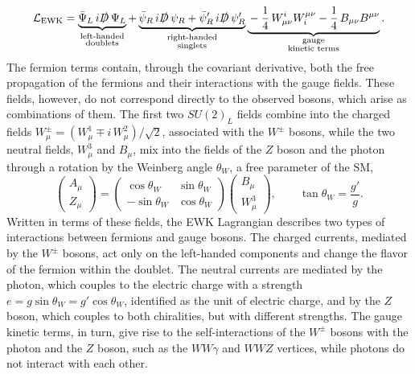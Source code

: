 \begin{equation}
    \mathcal{L}_{\text{EWK}} =
    \underbrace{\bar{\Psi}_L\, i \slashed{D}\, \Psi_L}_{\substack{\text{left-handed}\\ \text{doublets}}}
    + \underbrace{\bar{\psi}_R\, i \slashed{D}\, \psi_R + \bar{\psi}'_R\, i \slashed{D}\, \psi'_R}_{\substack{\text{right-handed}\\ \text{singlets}}}
    \underbrace{{}- \frac{1}{4}\, W^i_{\mu\nu} W_i^{\mu\nu} - \frac{1}{4}\, B_{\mu\nu} B^{\mu\nu}}_{\substack{\text{gauge}\\ \text{kinetic terms}}}.
    \label{EW_Lagrangian}
\end{equation}
%
The fermion terms contain, through the covariant derivative, both the free propagation of the fermions and their interactions with the gauge fields. These fields, however, do not correspond directly to the observed bosons, which arise as combinations of them. The first two $SU(2)_L$ fields combine into the charged fields $W^\pm_\mu = (W^1_\mu \mp i\,W^2_\mu)/\sqrt{2}$, associated with the $W^\pm$ bosons, while the two neutral fields, $W^3_\mu$ and $B_\mu$, mix into the fields of the $Z$ boson and the photon through a rotation by the Weinberg angle $\theta_W$, a free parameter of the SM,
\begin{equation}
    \begin{pmatrix} A_\mu \\ Z_\mu \end{pmatrix} = \begin{pmatrix} \cos\theta_W & \sin\theta_W \\ -\sin\theta_W & \cos\theta_W \end{pmatrix} \begin{pmatrix} B_\mu \\ W^3_\mu \end{pmatrix}, \qquad \tan\theta_W = \frac{g'}{g}.
    \label{eq:weinberg_mixing}
\end{equation}
%
Written in terms of these fields, the EWK Lagrangian describes two types of interactions between fermions and gauge bosons. The charged currents, mediated by the $W^\pm$ bosons, act only on the left-handed components and change the flavor of the fermion within the doublet. The neutral currents are mediated by the photon, which couples to the electric charge with a strength $e = g\sin\theta_W = g'\cos\theta_W$, identified as the unit of electric charge, and by the $Z$ boson, which couples to both chiralities, but with different strengths. The gauge kinetic terms, in turn, give rise to the self-interactions of the $W^\pm$ bosons with the photon and the $Z$ boson, such as the $WW\gamma$ and $WWZ$ vertices, while photons do not interact with each other.\medskip



